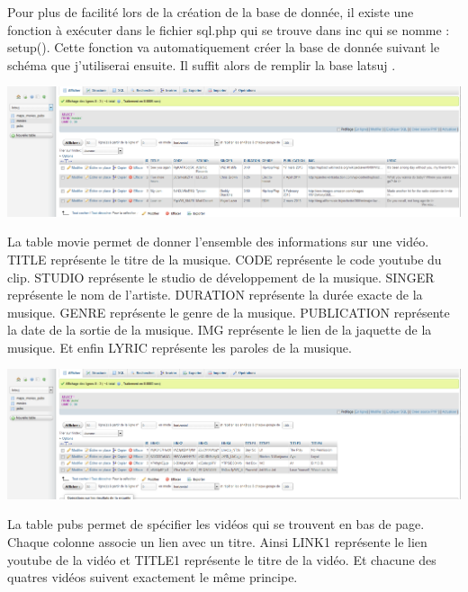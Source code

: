 \documentclass{article}
\begin{document}
Pour plus de facilit\'e lors de la cr\'eation de la base de donn\'ee, il existe une fonction \`a ex\'ecuter dans le fichier sql.php qui se trouve dans inc qui se nomme : setup(). Cette fonction va automatiquement cr\'eer la base de donn\'ee suivant le sch\'ema que j'utiliserai ensuite. Il suffit alors de remplir la base \og latsuj \fg{}.  
\begin{center}
\vspace{0.5cm}
\includegraphics[width=\textwidth]{p27}
\vspace{0.5cm}\\
\end{center}
La table \og movie \fg{} permet de donner l'ensemble des informations sur une vid\'eo. \og TITLE \fg{} repr\'esente le titre de la musique. \og CODE \fg{} repr\'esente le code youtube du clip. \og STUDIO \fg{} repr\'esente le studio de d\'eveloppement de la musique. \og SINGER \fg{} repr\'esente le nom de l'artiste. \og DURATION \fg{} repr\'esente la dur\'ee exacte de la musique. \og GENRE \fg{} repr\'esente le genre de la musique. \og PUBLICATION \fg{} repr\'esente la date de la sortie de la musique. \og IMG \fg{} repr\'esente le lien de la jaquette de la musique. Et enfin \og LYRIC \fg{} repr\'esente les paroles de la musique.          
\begin{center}
\vspace{0.5cm}
\includegraphics[width=\textwidth]{p28}
\vspace{0.5cm}\\
\end{center}
La table \og pubs \fg{} permet de sp\'ecifier les vid\'eos qui se trouvent en bas de page. Chaque colonne associe un lien avec un titre. Ainsi \og LINK1 \fg{} repr\'esente le lien youtube de la vid\'eo et \og TITLE1 \fg{} repr\'esente le titre de la vid\'eo. Et chacune des quatres vid\'eos suivent exactement le m\^eme principe.\\
\end{document}
